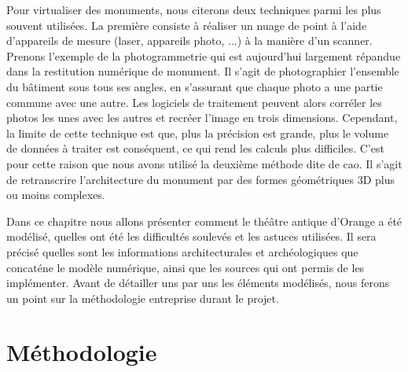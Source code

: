 Pour virtualiser des monuments, nous citerons deux techniques parmi les plus souvent utilisées. La première consiste à réaliser un nuage de point à l'aide d'appareils de mesure (laser, appareils photo, ...) à la manière d'un scanner. Prenons l'exemple de la photogrammetrie qui est aujourd'hui largement répandue dans la restitution numérique de monument. Il s'agit de photographier l'ensemble du bâtiment sous tous ses angles, en s'assurant que chaque photo a une partie commune avec une autre. Les logiciels de traitement peuvent alors corréler les photos les unes avec les autres et recréer l'image en trois dimensions. Cependant, la limite de cette technique est que, plus la précision est grande, plus le volume de données à traiter est conséquent, ce qui rend les calculs plus difficiles. C'est pour cette raison que nous avons utilisé la deuxième méthode dite de \gls{cao}. Il s'agit de retranscrire l'architecture du monument par des formes géométriques 3D plus ou moins complexes.

Dans ce chapitre nous allons présenter comment le théâtre antique d'Orange a été modélisé, quelles ont été les difficultés soulevés et les astuces utilisées. Il sera précisé quelles sont les informations architecturales et archéologiques que concaténe le modèle numérique, ainsi que les sources qui ont permis de les implémenter.
Avant de détailler uns par uns les éléments modélisés, nous ferons un point sur la méthodologie entreprise durant le projet.


\section{Méthodologie}

